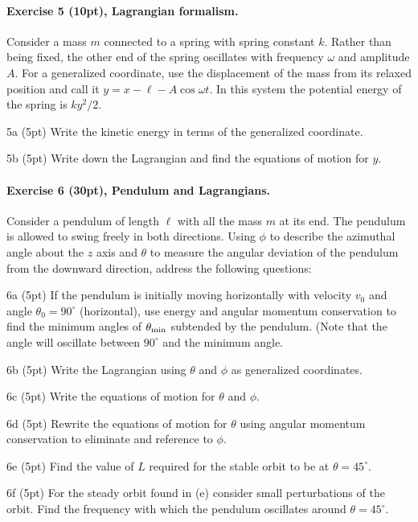 \documentclass[%
oneside,                 %
final,                   %
10pt]{article}
\begin{document}
\paragraph{Exercise 5 (10pt), Lagrangian formalism.}
Consider a mass $m$ connected to a spring with spring constant
  $k$. Rather than being fixed, the other end of the spring oscillates
  with frequency $\omega$ and amplitude $A$. For a generalized
  coordinate, use the displacement of the mass from its relaxed
  position and call it $y=x-\ell-A\cos\omega t$. In this system the
  potential energy of the spring is $ky^2/2$.


\item 5a (5pt)  Write the kinetic energy in terms of the generalized coordinate.

\item 5b (5pt) Write down the Lagrangian and find the equations of motion for $y$.


\paragraph{Exercise 6 (30pt), Pendulum and Lagrangians.}
Consider a pendulum of length $\ell$ with all the mass $m$ at
  its end. The pendulum is allowed to swing freely in both
  directions. Using $\phi$ to describe the azimuthal angle about the
  $z$ axis and $\theta$ to measure the angular deviation of the
  pendulum from the downward direction, address the following
  questions:


\item 6a (5pt) If the pendulum is initially moving horizontally with velocity $v_0$ and angle $\theta_0=90^\circ$ (horizontal), use energy and angular momentum conservation to find the minimum angles of $\theta_{\rm min}$ subtended by the pendulum. (Note that the angle  will oscillate between $90^\circ$ and the minimum angle.

\item 6b (5pt) Write the Lagrangian using $\theta$ and $\phi$ as generalized coordinates.

\item 6c (5pt) Write the equations of motion for $\theta$ and $\phi$.

\item 6d (5pt) Rewrite the equations of motion for $\theta$ using angular momentum conservation to eliminate and reference to $\phi$.

\item 6e (5pt) Find the value of $L$ required for the stable orbit to be at $\theta=45^\circ$.

\item 6f (5pt)  For the steady orbit found in (e) consider small perturbations of the orbit. Find the frequency with which the pendulum oscillates around $\theta=45^\circ$.




\end{document}
